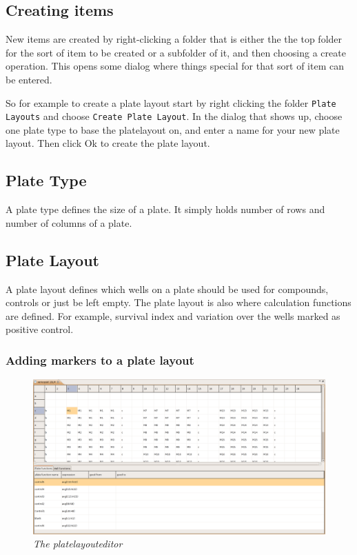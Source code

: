 \documentclass[a4paper,10pt]{article}
\begin{document}
        \subsection{Creating items}
            New items are created by right-clicking a folder that is either the
            the top folder for the sort of item to be created or a subfolder of
            it, and then choosing a create operation. This opens some dialog
            where things special for that sort of item can be entered. 

            So for example to create a plate layout start by right clicking the
            folder \texttt{Plate Layouts} and choose \texttt{Create Plate
            Layout}. In the dialog that shows up, choose one plate type to base
            the platelayout on, and enter a name for your new plate layout.
            Then click Ok to create the plate layout.

        \subsection{Plate Type} A plate type defines the size of a plate. It
            simply holds number of rows and number of columns of a plate. 

        \subsection{Plate Layout}
            A plate layout defines which wells on a plate should be used for
            compounds, controls or just be left empty. The plate layout is also
            where calculation functions are defined. For example, survival
            index and variation over the wells marked as positive control. 

            \subsubsection{Adding markers to a plate layout}
                \begin{figure}[htbp]
                    \begin{center}
                        \includegraphics[width=1\textwidth]
                                        {images/plateLayoutEditor.png}
                    \end{center}
                    \caption{\textit{The platelayouteditor}}
                    \label{platelayoutEditor}
                \end{figure}
\end{document}
